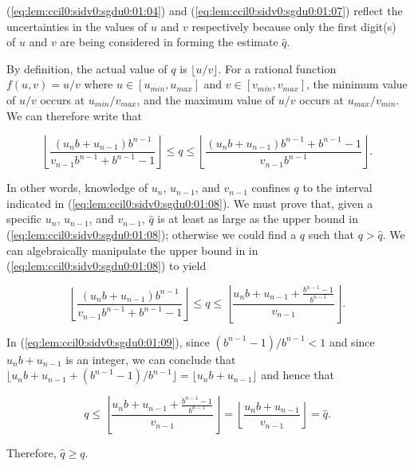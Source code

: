 \begin{vworklemmaproof}
(\ref{eq:lem:ccil0:sidv0:sgdu0:01:04}) and
(\ref{eq:lem:ccil0:sidv0:sgdu0:01:07}) reflect the uncertainties in the 
values of $u$ and $v$ respectively because only the first digit(s) of
$u$ and $v$ are being considered in forming the estimate $\hat{q}$.

By definition, the actual value of $q$ is $\lfloor{}u/v\rfloor$.  For a 
rational function $f(u,v) = u/v$ where $u \in [u_{min}, u_{max}]$ and
$v \in [v_{min}, v_{max}]$, the minimum value of $u/v$ occurs at 
$u_{min}/v_{max}$, and the maximum value of $u/v$ occurs at
$u_{max}/v_{min}$.  We can therefore write that

\begin{equation}
\label{eq:lem:ccil0:sidv0:sgdu0:01:08}
\left\lfloor{\frac{(u_n b + u_{n-1}) b^{n-1}}{v_{n-1} b^{n-1} + b^{n-1} - 1}}\right\rfloor
\leq
q
\leq
\left\lfloor{\frac{(u_n b + u_{n-1}) b^{n-1} + b^{n-1} - 1}{v_{n-1} b^{n-1}}}\right\rfloor .
\end{equation} 

In other words, knowledge of $u_{n}$, $u_{n-1}$, and $v_{n-1}$ confines $q$ to the 
interval indicated in (\ref{eq:lem:ccil0:sidv0:sgdu0:01:08}).  We must prove that,
given a specific $u_{n}$, $u_{n-1}$, and $v_{n-1}$, $\hat{q}$ is at least as large as
the upper bound in (\ref{eq:lem:ccil0:sidv0:sgdu0:01:08}); otherwise we could find a
$q$ such that $q > \hat{q}$.  We can algebraically manipulate the upper bound in 
in (\ref{eq:lem:ccil0:sidv0:sgdu0:01:08}) to yield

\begin{equation}
\label{eq:lem:ccil0:sidv0:sgdu0:01:09}
\left\lfloor{\frac{(u_n b + u_{n-1}) b^{n-1}}{v_{n-1} b^{n-1} + b^{n-1} - 1}}\right\rfloor
\leq
q
\leq
\left\lfloor{\frac{u_n b + u_{n-1} + \frac{b^{n-1}-1}{b^{n-1}}}{v_{n-1}}}\right\rfloor .
\end{equation} 

In (\ref{eq:lem:ccil0:sidv0:sgdu0:01:09}), since $(b^{n-1}-1)/b^{n-1} < 1$ and since
$u_n b + u_{n-1}$ is an integer, we can conclude that
$\lfloor u_n b + u_{n-1} + (b^{n-1}-1)/b^{n-1} \rfloor = \lfloor u_n b + u_{n-1} \rfloor$
and hence that

\begin{equation}
\label{eq:lem:ccil0:sidv0:sgdu0:01:10}
q
\leq
\left\lfloor{\frac{u_n b + u_{n-1} + \frac{b^{n-1}-1}{b^{n-1}}}{v_{n-1}}}\right\rfloor 
=
\left\lfloor{\frac{u_n b + u_{n-1}}{v_{n-1}}}\right\rfloor 
=
\hat{q} .
\end{equation} 

Therefore, $\hat{q} \geq q$.
\end{vworklemmaproof}
\vworklemmafooter{}


